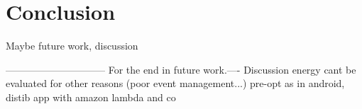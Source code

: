 \documentclass[a4paper,12pt,twoside]{../includes/ThesisStyle}
\begin{document}
\fi

\chapter{Conclusion}
\label{chap:conclusion}
\minitoc

Maybe future work, discussion


------------------------------
For the end in future work.----
Discussion energy cant be evaluated for other reasons (poor event management...) pre-opt as in android, distib app with amazon lambda and co



\ifx\wholebook\relax\else
    
\end{document}
